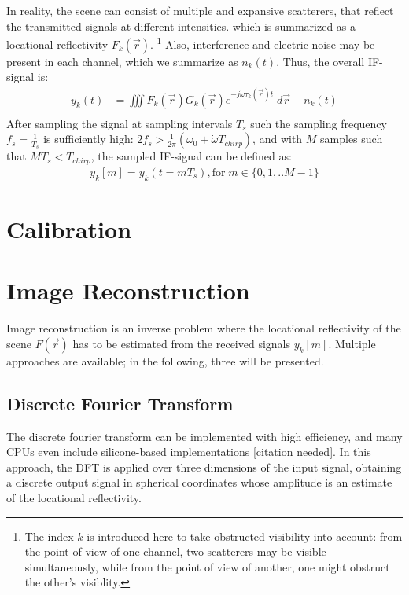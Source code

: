 In reality, the scene can consist of multiple and expansive scatterers,
that reflect the transmitted signals at different intensities.
which is summarized as a locational reflectivity $F_k(\vec r)$.
\footnote{
    The index $k$ is introduced here to take obstructed visibility into account:
    from the point of view of one channel, two scatterers may be visible simultaneously,
    while from the point of view of another, one might obstruct the other's visiblity.
}
Also, interference and electric noise may be present in each channel,
which we summarize as $n_k(t)$.
Thus, the overall IF-signal is:
\begin{align}
    y_k(t) & = \iiint F_k(\vec r)G_k(\vec r) e^{-j\dot\omega\tau_k(\vec r)t} \;d\vec r + n_k(t) \\
\end{align}
After sampling the signal at sampling intervals $T_s$ such the sampling frequency $f_s = \frac{1}{T_s}$
is sufficiently high: ${2f_s > \frac{1}{2\pi}(\omega_0 + \dot \omega T_{chirp})}$, and with $M$ samples such that $MT_s < T_{chirp}$,
the sampled IF-signal can be defined as:
\begin{align}
    y_k[m] = y_k(t=mT_s), \text{for}\;m \in \{0,1,..M-1\}
\end{align}


\section{Calibration}

\section{Image Reconstruction}
Image reconstruction is an inverse problem where the locational reflectivity of the scene $F(\vec r)$
has to be estimated from the received signals $y_k[m]$.
Multiple approaches are available; in the following, three will be presented.

\subsection{Discrete Fourier Transform}
The discrete fourier transform can be implemented with high efficiency,
and many CPUs even include silicone-based implementations [citation needed].
In this approach, the DFT is applied over three dimensions of the input signal,
obtaining a discrete output signal in spherical coordinates whose amplitude is an estimate of the locational reflectivity.

